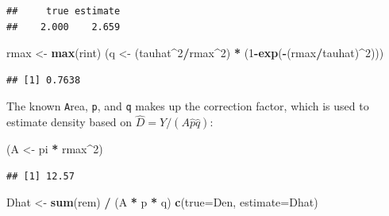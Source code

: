 \documentclass[12pt,]{book}
\newenvironment{Shaded}{\begin{snugshade}}{\end{snugshade}}
\newcommand{\DataTypeTok}[1]{\textcolor[rgb]{0.13,0.29,0.53}{#1}}
\newcommand{\DecValTok}[1]{\textcolor[rgb]{0.00,0.00,0.81}{#1}}
\newcommand{\KeywordTok}[1]{\textcolor[rgb]{0.13,0.29,0.53}{\textbf{#1}}}
\newcommand{\NormalTok}[1]{#1}
\newcommand{\OperatorTok}[1]{\textcolor[rgb]{0.81,0.36,0.00}{\textbf{#1}}}
\newcommand{\StringTok}[1]{\textcolor[rgb]{0.31,0.60,0.02}{#1}}
\begin{document}
\begin{Shaded}
\end{Shaded}

\begin{verbatim}
##     true estimate 
##    2.000    2.659
\end{verbatim}

\begin{Shaded}
\begin{Highlighting}[]
\NormalTok{rmax <-}\StringTok{ }\KeywordTok{max}\NormalTok{(rint)}
\NormalTok{(q <-}\StringTok{ }\NormalTok{(tauhat}\OperatorTok{^}\DecValTok{2}\OperatorTok{/}\NormalTok{rmax}\OperatorTok{^}\DecValTok{2}\NormalTok{) }\OperatorTok{*}\StringTok{ }\NormalTok{(}\DecValTok{1}\OperatorTok{-}\KeywordTok{exp}\NormalTok{(}\OperatorTok{-}\NormalTok{(rmax}\OperatorTok{/}\NormalTok{tauhat)}\OperatorTok{^}\DecValTok{2}\NormalTok{)))}
\end{Highlighting}
\end{Shaded}

\begin{verbatim}
## [1] 0.7638
\end{verbatim}

The known \texttt{A}rea, \texttt{p}, and \texttt{q} makes up the correction factor,
which is used to estimate density based on \(\hat{D}=Y/(A \hat{p}\hat{q})\):

\begin{Shaded}
\begin{Highlighting}[]
\NormalTok{(A <-}\StringTok{ }\NormalTok{pi }\OperatorTok{*}\StringTok{ }\NormalTok{rmax}\OperatorTok{^}\DecValTok{2}\NormalTok{)}
\end{Highlighting}
\end{Shaded}

\begin{verbatim}
## [1] 12.57
\end{verbatim}

\begin{Shaded}
\begin{Highlighting}[]
\NormalTok{Dhat <-}\StringTok{ }\KeywordTok{sum}\NormalTok{(rem) }\OperatorTok{/}\StringTok{ }\NormalTok{(A }\OperatorTok{*}\StringTok{ }\NormalTok{p }\OperatorTok{*}\StringTok{ }\NormalTok{q)}
\KeywordTok{c}\NormalTok{(}\DataTypeTok{true=}\NormalTok{Den, }\DataTypeTok{estimate=}\NormalTok{Dhat)}
\end{Highlighting}
\end{Shaded}
\end{document}
